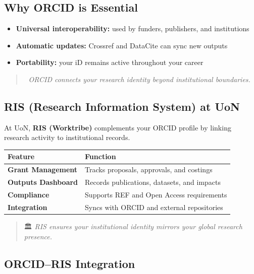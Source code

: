 \documentclass[
  letterpaper,
  DIV=11,
  numbers=noendperiod]{scrartcl}
\providecommand{\tightlist}{%
  \setlength{\itemsep}{0pt}\setlength{\parskip}{0pt}}
\begin{document}
\subsection{Why ORCID is Essential}\label{why-orcid-is-essential}

\begin{itemize}
\tightlist
\item
  \textbf{Universal interoperability:} used by funders, publishers, and
  institutions\\
\item
  \textbf{Automatic updates:} Crossref and DataCite can sync new
  outputs\\
\item
  \textbf{Portability:} your iD remains active throughout your career
\end{itemize}

\begin{quote}
🔗 \emph{ORCID connects your research identity beyond institutional
boundaries.}
\end{quote}

\subsection{RIS (Research Information System) at
UoN}\label{ris-research-information-system-at-uon}

At UoN, \textbf{RIS (Worktribe)} complements your ORCID profile by
linking research activity to institutional records.

\begin{longtable}[]{@{}ll@{}}
\toprule\noalign{}
\textbf{Feature} & \textbf{Function} \\
\midrule\noalign{}
\endhead
\bottomrule\noalign{}
\endlastfoot
\textbf{Grant Management} & Tracks proposals, approvals, and costings \\
\textbf{Outputs Dashboard} & Records publications, datasets, and
impacts \\
\textbf{Compliance} & Supports REF and Open Access requirements \\
\textbf{Integration} & Syncs with ORCID and external repositories \\
\end{longtable}

\begin{quote}
🏛️ \emph{RIS ensures your institutional identity mirrors your global
research presence.}
\end{quote}

\subsection{ORCID--RIS Integration}\label{orcidris-integration}
\end{document}
